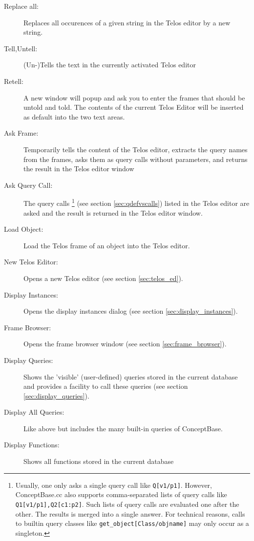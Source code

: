 \begin{description}
\begin{description}
	\item[Replace all:] Replaces all occurences of a given string in the Telos editor by a new string.
	\item[Tell,Untell:] (Un-)Tells the text in the currently activated Telos editor
	\item[Retell:] A new window will popup and ask you to enter the frames that should be untold and
told. The contents of the current Telos Editor will be inserted as default into the two text areas.
	\item[Ask Frame:] Temporarily tells the content of the Telos editor, 
        extracts the query names from the frames, asks them
        as query calls without parameters, and returns the result in the Telos editor window
	\item[Ask Query Call:] The query calls%
\footnote{Usually, one only asks a single query call like {\tt Q[v1/p1]}. However, ConceptBase.cc also
supports comma-separated lists of query calls like {\tt Q1[v1/p1],Q2[c1:p2]}. Such lists of query calls
are evaluated one after the other. The results is merged into a single answer. For technical reasons,
calls to builtin query classes like {\tt get\_object[Class/objname]} may only occur as a singleton.}
        (see section \ref{sec:qdefvscalls}) listed in the Telos editor are asked
        and the result is returned in the Telos editor window.
	\item[Load Object:] Load the Telos frame of an object into the Telos editor.
	\end{description}
\item[Browse:]
	\begin{description}
	\item[New Telos Editor:] Opens a new Telos editor (see section \ref{sec:telos_ed}).
	\item[Display Instances:] Opens the display instances dialog (see section \ref{sec:display_instances}).
	\item[Frame Browser:] Opens the frame browser window (see section \ref{sec:frame_browser}).
	\item[Display Queries:] Shows the 'visible' (user-defined) queries stored in the current database and provides a facility to
	call these queries (see section \ref{sec:display_queries}).
        \item[Display All Queries:] Like above but includes the many built-in queries of ConceptBase.
        \item[Display Functions:] Shows all functions stored in the current database 

\end{description}
\end{description}

